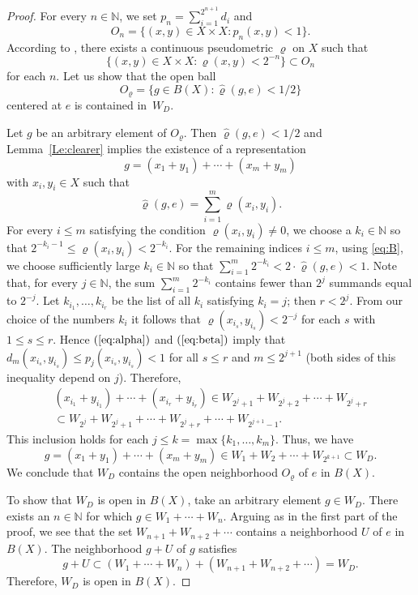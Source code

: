 \documentclass[a4paper,12pt]{amsart}
\def\sub{\subset}
\theoremstyle{definition}
\begin{document}
\begin{proof}
For every $n\in \mathbb N$, we set 
$p_n=\sum_{i=1}^{2^{n+1}}d_i$ and 
\begin{equation} 
\label{eq:alpha}
O_n= \{(x,y)\in X\times X: p_n(x,y)<1\}. 
\end{equation} 
According to \cite[Theorem~8.1.10]{Eng}, there exists a continuous pseudometric  
$\varrho$ on $X$ such that 
\begin{equation} 
\label{eq:beta}
\{(x,y)\in X\times X: \varrho(x,y)<2^{-n}\}\sub O_n 
\end{equation} 
for each $n$. Let us show that the open ball 
$$ 
O_\varrho = \{g\in B(X): \widehat{\varrho}(g,e)<1/2\} 
$$ 
centered at $e$ is contained in~$W_D$.

Let $g$ be an arbitrary element of $O_\varrho$. Then
$\widehat{\varrho}(g,e)<1/2$ and Lemma~\ref{Le:clearer} 
implies the existence of a representation
$$
g=(x_1+y_1)+\cdots+(x_m+y_m) 
$$
with $x_i,y_i\in X$ such that
\begin{equation}
\label{eq:B}
\widehat{\varrho}(g,e)=\sum_{i=1}^m \varrho(x_i,y_i). 
\end{equation}
For every $i\le m$ satisfying the condition $\varrho(x_i,y_i)\neq 0$, we 
choose  a $k_i\in \mathbb N$ so that $2^{-k_i-1}\leq 
\varrho(x_i,y_i)<2^{-k_i}$. For the remaining indices $i\le m$, using 
\eqref{eq:B}, we choose sufficiently large $k_i\in \mathbb N$ so that 
$\sum_{i=1}^m 2^{-k_i}<2 \cdot\widehat{\varrho}(g,e)<1$. Note that, for every 
$j\in \mathbb N$, the sum $\sum_{i=1}^m 2^{-k_i}$ contains fewer than 
$2^j$ summands equal to $2^{-j}$. Let $k_{i_1},\ldots,k_{i_r}$ be the list of 
all $k_i$ satisfying $k_i=j$; then $r<2^j$. From our choice of the numbers 
$k_i$ it follows that $\varrho(x_{i_s},y_{i_s})<2^{-j}$ for each $s$ with 
$1\leq s\leq r$. Hence $(\ref{eq:alpha})$ and $(\ref{eq:beta})$ imply that 
$d_m(x_{i_s},y_{i_s})\leq p_j(x_{i_s},y_{i_s})<1$ for all $s\leq r$ and 
$m\leq 2^{j+1}$ (both sides of this inequality depend on $j$). 
Therefore, 
\begin{multline*}
(x_{i_1}+y_{i_1})+\cdots+ 
(x_{i_r}+y_{i_r}) \in  W_{2^j+1}+ 
W_{2^{j}+2}+\cdots+W_{2^j+r}\\
 \sub  W_{2^{j}}+W_{2^{j}+1}+\cdots + W_{2^j+r}+
\cdots + W_{2^{j+1}-1}.
\end{multline*}
This inclusion holds for each $j\le k=\max\{k_1,\ldots,k_m\}$.
Thus, we have
$$
g=(x_1+y_1)+\cdots+(x_m+y_m)\in W_1+W_2+\cdots+W_{2^{k+1}}\sub W_D.
$$
We conclude that $W_D$ contains the open neighborhood $O_\varrho$ of $e$ 
in $B(X)$. 

To show that $W_D$ is open in $B(X)$, take an arbitrary element $g\in W_D$.
There exists an $n\in\mathbb N$ for which $g\in W_1+\cdots+W_n$.
Arguing as in the first part of the proof, we see that the set $W_{n+1}+
W_{n+2}+\cdots$ contains a neighborhood $U$ of $e$ in $B(X)$. The neighborhood 
$g+U$ of $g$ satisfies 
$$ 
g+U\sub(W_1+\cdots+W_n)+(W_{n+1}+W_{n+2}+\cdots)=W_D.
$$
Therefore, $W_D$ is open in $B(X)$.
\end{proof}
\end{document}
